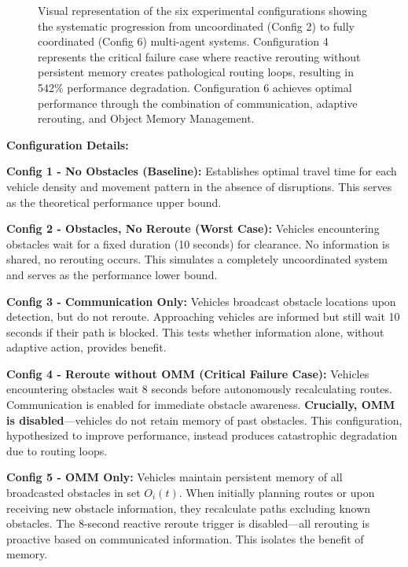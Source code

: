 \documentclass[conference]{IEEEtran}
\newcommand{\cmark}{\ding{51}}%
\newcommand{\xmark}{\ding{55}}%
\begin{document}
\begin{figure}[t]
\caption{Visual representation of the six experimental configurations showing the systematic progression from uncoordinated (Config 2) to fully coordinated (Config 6) multi-agent systems. Configuration 4 represents the critical failure case where reactive rerouting without persistent memory creates pathological routing loops, resulting in 542\% performance degradation. Configuration 6 achieves optimal performance through the combination of communication, adaptive rerouting, and Object Memory Management.}
\label{fig:exp_design}
\end{figure}

\textbf{Configuration Details:}

\textbf{Config 1 - No Obstacles (Baseline):} Establishes optimal travel time for each vehicle density and movement pattern in the absence of disruptions. This serves as the theoretical performance upper bound.

\textbf{Config 2 - Obstacles, No Reroute (Worst Case):} Vehicles encountering obstacles wait for a fixed duration (10 seconds) for clearance. No information is shared, no rerouting occurs. This simulates a completely uncoordinated system and serves as the performance lower bound.

\textbf{Config 3 - Communication Only:} Vehicles broadcast obstacle locations upon detection, but do not reroute. Approaching vehicles are informed but still wait 10 seconds if their path is blocked. This tests whether information alone, without adaptive action, provides benefit.

\textbf{Config 4 - Reroute without OMM (Critical Failure Case):} Vehicles encountering obstacles wait 8 seconds before autonomously recalculating routes. Communication is enabled for immediate obstacle awareness. \textbf{Crucially, OMM is disabled}—vehicles do not retain memory of past obstacles. This configuration, hypothesized to improve performance, instead produces catastrophic degradation due to routing loops.

\textbf{Config 5 - OMM Only:} Vehicles maintain persistent memory of all broadcasted obstacles in set $O_i(t)$. When initially planning routes or upon receiving new obstacle information, they recalculate paths excluding known obstacles. The 8-second reactive reroute trigger is disabled—all rerouting is proactive based on communicated information. This isolates the benefit of memory.
\end{document}
